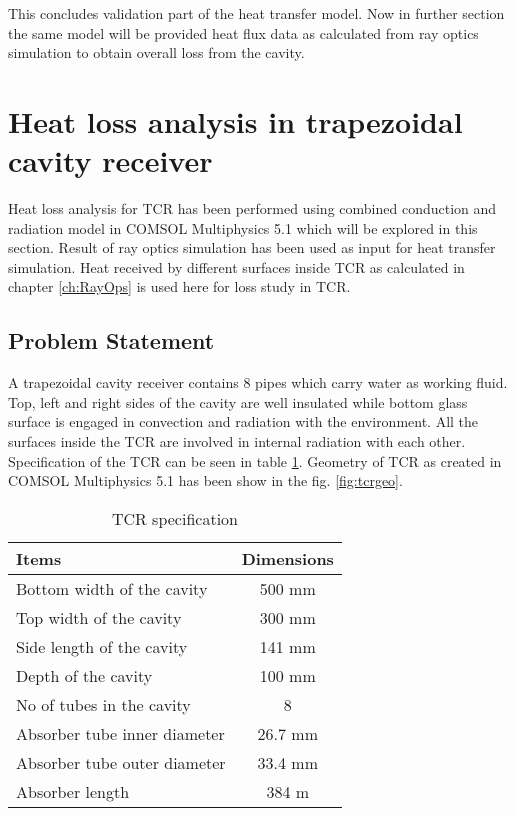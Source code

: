 This concludes validation part of the heat transfer model. Now in further section the same model will be provided heat flux data as calculated from ray optics simulation to obtain overall loss from the cavity.

\section{Heat loss analysis in trapezoidal cavity receiver}
Heat loss analysis for TCR has been performed using combined conduction and radiation model in COMSOL Multiphysics 5.1 which will be explored in this section. Result of ray optics simulation has been used as input for heat transfer simulation. Heat received by different surfaces inside TCR as calculated in chapter \ref{ch:RayOps} is used here for loss study in TCR.

\subsection{Problem Statement}
A trapezoidal cavity receiver contains 8 pipes which carry water as working fluid. Top, left and right sides of the cavity are well insulated while bottom glass surface is engaged in convection and radiation with the environment. All the surfaces inside the TCR are involved in internal radiation with each other. Specification of the TCR can be seen in table \ref{tab:tcrspectab}. Geometry of TCR as created in COMSOL Multiphysics 5.1 has been show in the fig. \ref{fig:tcrgeo}.

\begin{table}[H]
\centering
\caption{TCR specification}
\label{tab:tcrspectab}
\begin{tabular}{@{}|l|c|@{}}
\toprule
\textbf{Items}                      & \textbf{Dimensions} \\ \midrule
Bottom width of the cavity          & 500 mm              \\ \midrule
Top width of the cavity             & 300 mm              \\ \midrule
Side length of the cavity           & 141 mm              \\ \midrule
Depth of the cavity                 & 100 mm              \\ \midrule
No of tubes in the cavity           & 8                   \\ \midrule
Absorber tube inner diameter        & 26.7 mm             \\ \midrule
Absorber tube outer diameter        & 33.4 mm             \\ \midrule
Absorber length                     & 384 m               \\ \bottomrule
\end{tabular}
\end{table}

